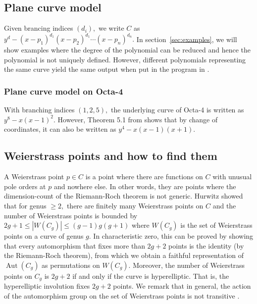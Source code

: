 \documentclass[12pt,reqno]{amsart}
\DeclareMathOperator{\Aut}{Aut}
\theoremstyle{definition}
\theoremstyle{remark}
\begin{document}
\subsection{Plane curve model}
\label{subsec:polynomial} Given brancing indices $(d_i),$ we write $C$ as $y^d - (x - p_1)^{d_1} (x - p_2)^{d_1} \cdots (x - p_n)^{d_n}.$ In section~\ref{sec:examples}, we will show examples where the degree of the polynomial can be reduced and hence the polynomial is not uniquely defined. However, different polynomials representing the same curve yield the same output when put in the program in \cite{jeroen}.


\subsubsection*{Plane curve model on Octa-4}
With branching indices $(1, 2, 5),$ the underlying curve of Octa-4 is written as $y^8 - x (x-1)^2.$ However, Theorem 5.1 from \cite{dami} shows that by change of coordinates, it can also be written as $y^4 - x (x-1) (x+1).$

\subsection{Weierstrass points and how to find them}

A Weierstrass point $p \in C$ is a point where there are functions on $C$ with unusual pole orders at $p$ and nowhere else. In other words, they are points where the dimension-count of the Riemann-Roch theorem is not generic. Hurwitz showed that for genus $\geq 2,$ there are finitely many Weierstrass points on $C$ and the number of Weierstrass points is bounded by $2 g + 1 \leq |W(C_g)| \leq (g - 1) g (g + 1)$ where $W(C_g)$ is the set of Weierstrass points on a curve of genus $g.$ In characteristic zero, this can be proved by showing that every automorphism that fixes more than $2 g + 2$ points is the identity (by the Riemann-Roch theorem), from which we obtain a faithful representation of $\Aut(C_g)$ as permutations on $W(C_g)$. Moreover, the number of Weierstrass points on $C_g$ is $2 g + 2$ if and only if the curve is hyperelliptic. That is, the hyperelliptic involution fixes $2 g + 2$ points. We remark that in general, the action of the automorphism group on the set of Weierstrass points is not transitive \cite{sl}. 
\end{document}
